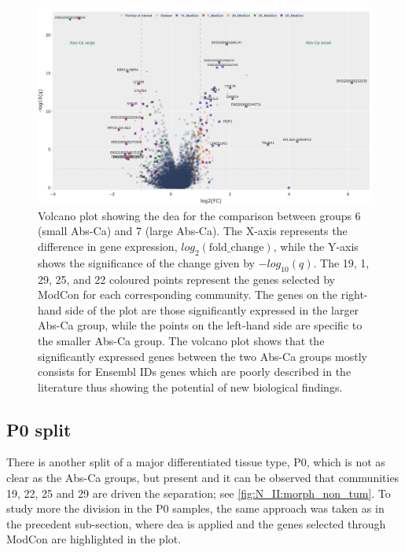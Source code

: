 \begin{figure}   
    \centering
    \includegraphics[width=1.0\textwidth,height=1.0\textheight,keepaspectratio]{Sections/Network_II/resources/non_tum/diff_split_dea.png}
    \caption[Volcano plot between the ABS-Ca splits]{Volcano plot showing the \acrlong{dea} for the comparison between groups 6 (small Abs-Ca) and 7 (large Abs-Ca). The X-axis represents the difference in gene expression, $log_2(\text{fold\_change})$, while the Y-axis shows the significance of the change given by $-log_{10}(q)$. The 19, 1, 29, 25, and 22 coloured points represent the genes selected by ModCon for each corresponding community. The genes on the right-hand side of the plot are those significantly expressed in the larger Abs-Ca group, while the points on the left-hand side are specific to the smaller Abs-Ca group. The volcano plot shows that the significantly expressed genes between the two Abs-Ca groups mostly consists for Ensembl IDs genes which are poorly described in the literature thus showing the potential of new biological findings.}
    \label{fig:N_II:diff_split}
\end{figure}


\subsection{P0 split} \label{s:N_II:p0_split}

There is another split of a major differentiated tissue type, P0,  which is not as clear as the Abs-Ca groups, but present and it can be observed that communities 19, 22, 25 and 29 are driven the separation; see \cref{fig:N_II:morph_non_tum}. To study more the division in the P0 samples, the same approach was taken as in the precedent sub-section, where \acrshort{dea} is applied and the genes selected through ModCon are highlighted in the plot.

